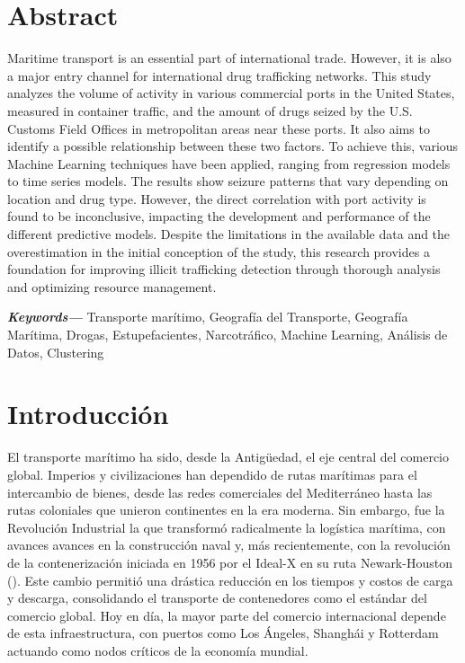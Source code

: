 \documentclass[12pt]{article}
\providecommand{\keywords}[1]
{
	\small	
	\textbf{\textit{Keywords---}} #1
}
\begin{document}
\section{\label{abstract}Abstract}
Maritime transport is an essential part of international trade. However, it is also a major entry channel for international drug trafficking networks. This study analyzes the volume of activity in various commercial ports in the United States, measured in container traffic, and the amount of drugs seized by the U.S. Customs Field Offices in metropolitan areas near these ports. It also aims to identify a possible relationship between these two factors. To achieve this, various Machine Learning techniques have been applied, ranging from regression models to time series models. The results show seizure patterns that vary depending on location and drug type. However, the direct correlation with port activity is found to be inconclusive, impacting the development and performance of the different predictive models. Despite the limitations in the available data and the overestimation in the initial conception of the study, this research provides a foundation for improving illicit trafficking detection through thorough analysis and optimizing resource management.

\keywords{Transporte marítimo, Geografía del Transporte, Geografía Marítima, Drogas, Estupefacientes, Narcotráfico, Machine Learning, Análisis de Datos, Clustering}

\newpage

\section{\label{intro}Introducción}
	El transporte marítimo ha sido, desde la Antigüedad, el eje central del comercio global. Imperios y civilizaciones han dependido de rutas marítimas para el intercambio de bienes, desde las redes comerciales del Mediterráneo hasta las rutas coloniales que unieron continentes en la era moderna. Sin embargo, fue la Revolución Industrial la que transformó radicalmente la logística marítima, con avances avances en la construcción naval y, más recientemente, con la revolución de la contenerización iniciada en 1956 por el Ideal-X en su ruta Newark-Houston (\cite{wired2012container}). Este cambio permitió una drástica reducción en los tiempos y costos de carga y descarga, consolidando el transporte de contenedores como el estándar del comercio global. Hoy en día, la mayor parte del comercio internacional depende de esta infraestructura, con puertos como Los Ángeles, Shanghái y Rotterdam actuando como nodos críticos de la economía mundial.
	
\end{document}
